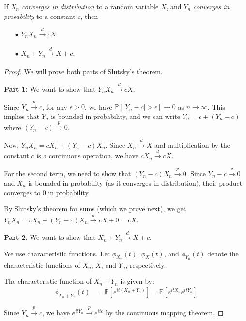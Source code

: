 \begin{theorem}
    If $X_n$ \textit{converges in distribution} to a random variable $X$, and $Y_n$ \textit{converges in probability} to a constant $c$, then 
    \begin{itemize}
        \item[$\bullet$] $Y_nX_n \xrightarrow[]{d} cX$
        \item[$\bullet$] $X_n + Y_n \xrightarrow[]{d} X + c$.
    \end{itemize}
\end{theorem}

\begin{proof}
    We will prove both parts of Slutsky's theorem.
    
    \textbf{Part 1:} We want to show that $Y_nX_n \xrightarrow{d} cX$.
    
    Since $Y_n \xrightarrow{p} c$, for any $\epsilon > 0$, we have $\mathbb{P}[|Y_n - c| > \epsilon] \to 0$ as $n \to \infty$.
    This implies that $Y_n$ is bounded in probability, and we can write $Y_n = c + (Y_n - c)$ where $(Y_n - c) \xrightarrow{p} 0$.
    
    Now, $Y_nX_n = cX_n + (Y_n - c)X_n$. Since $X_n \xrightarrow{d} X$ and multiplication by the constant $c$ is a continuous operation, we have $cX_n \xrightarrow{d} cX$.
    
    For the second term, we need to show that $(Y_n - c)X_n \xrightarrow{p} 0$. Since $Y_n - c \xrightarrow{p} 0$ and $X_n$ is bounded in probability (as it converges in distribution), their product converges to 0 in probability.
    
    By Slutsky's theorem for sums (which we prove next), we get $Y_nX_n = cX_n + (Y_n - c)X_n \xrightarrow{d} cX + 0 = cX$.
    
    \textbf{Part 2:} We want to show that $X_n + Y_n \xrightarrow{d} X + c$.
    
    We use characteristic functions. Let $\phi_{X_n}(t)$, $\phi_X(t)$, and $\phi_{Y_n}(t)$ denote the characteristic functions of $X_n$, $X$, and $Y_n$, respectively.
    
    The characteristic function of $X_n + Y_n$ is given by:
    \begin{align*}
        \phi_{X_n + Y_n}(t) &= \mathbb{E}[e^{it(X_n + Y_n)}] = \mathbb{E}[e^{itX_n}e^{itY_n}]
    \end{align*}
    
    Since $Y_n \xrightarrow{p} c$, we have $e^{itY_n} \xrightarrow{p} e^{itc}$ by the continuous mapping theorem.
    

\end{proof}
